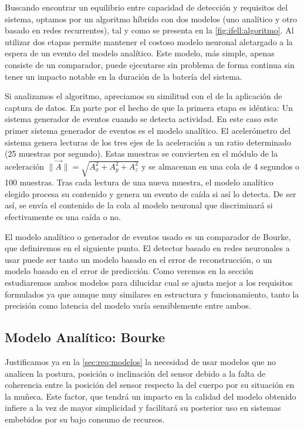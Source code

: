 Buscando encontrar un equilibrio entre capacidad de detección y requisitos del sistema, optamos por un algoritmo híbrido con dos modelos (uno analítico y otro basado en redes recurrentes), tal y como se presenta en la \autoref{fig:ifell:algoritmo}. Al utilizar dos etapas permite mantener el costoso modelo neuronal aletargado a la espera de un evento del modelo analítico. Este modelo, más simple, apenas consiste de un comparador, puede ejecutarse sin problema de forma continua sin tener un impacto notable en la duración de la batería del sistema. 


Si analizamos el algoritmo, apreciamos su similitud con el de la aplicación de captura de datos. En parte por el hecho de que la primera etapa es idéntica: Un sistema generador de eventos cuando se detecta actividad. En este caso este primer sistema generador de eventos es el modelo analítico. El acelerómetro del sistema genera lecturas de los tres ejes de la aceleración a un ratio determinado (25 muestras por segundo). Estas muestras se convierten en el módulo de la aceleración $\|\vec{A}\|=\sqrt{A_x^2 + A_y^2 + A_z^2}$ y se almacenan en una cola de 4 segundos o 100 muestras. Tras cada lectura de una nueva muestra, el modelo analítico elegido procesa su contenido y genera un evento de caída si así lo detecta. De ser así, se envía el contenido de la cola al modelo neuronal que discriminará si efectivamente es una caída o no.

El modelo analítico o generador de eventos usado es un comparador de Bourke, que definiremos en el siguiente punto. El detector basado en redes neuronales a usar puede ser tanto un modelo basado en el error de reconstrucción, o un modelo basado en el error de predicción. Como veremos en la sección  estudiaremos ambos modelos para dilucidar cual se ajusta mejor a los requisitos formulados ya que aunque muy similares en estructura y funcionamiento, tanto la precisión como latencia del modelo varía sensiblemente entre ambos.

\subsection{Modelo Analítico: Bourke}\label{sub:imp:model:analitico}

Justificamos ya en la \autoref{sec:req:modelos} la necesidad de usar modelos que no analicen la postura, posición o inclinación del sensor debido a la falta de coherencia entre la posición del sensor respecto la del cuerpo por su situación en la muñeca. Este factor, que tendrá un impacto en la calidad del modelo obtenido infiere a la vez de mayor simplicidad y facilitará su posterior uso en sistemas embebidos por su bajo consumo de recursos.

